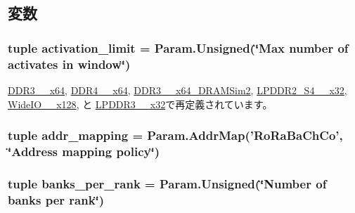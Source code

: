 \subsection{変数}
\hypertarget{classDRAMCtrl_1_1DRAMCtrl_a96b5e1268f3ab4cfa8c9203598fd98c9}{
\subsubsection[{activation\_\-limit}]{\setlength{\rightskip}{0pt plus 5cm}tuple {\bf activation\_\-limit} = Param.Unsigned(\char`\"{}Max number of activates in window\char`\"{})}}
\label{classDRAMCtrl_1_1DRAMCtrl_a96b5e1268f3ab4cfa8c9203598fd98c9}


\hyperlink{classDRAMCtrl_1_1DDR3__1600__x64_a8b6fa0e85fb36be7e08d5c992065d7c2}{DDR3\_\_\-x64}, \hyperlink{classDRAMCtrl_1_1DDR4__2400__x64_a8b6fa0e85fb36be7e08d5c992065d7c2}{DDR4\_\_\-x64}, \hyperlink{classDRAMCtrl_1_1DDR3__1333__x64__DRAMSim2_a8b6fa0e85fb36be7e08d5c992065d7c2}{DDR3\_\_\-x64\_\-DRAMSim2}, \hyperlink{classDRAMCtrl_1_1LPDDR2__S4__1066__x32_a8b6fa0e85fb36be7e08d5c992065d7c2}{LPDDR2\_\-S4\_\_\-x32}, \hyperlink{classDRAMCtrl_1_1WideIO__200__x128_a8b6fa0e85fb36be7e08d5c992065d7c2}{WideIO\_\_\-x128}, と \hyperlink{classDRAMCtrl_1_1LPDDR3__1600__x32_a8b6fa0e85fb36be7e08d5c992065d7c2}{LPDDR3\_\_\-x32}で再定義されています。\hypertarget{classDRAMCtrl_1_1DRAMCtrl_a35512ed731b19b2eacfae921a3c159e0}{
\subsubsection[{addr\_\-mapping}]{\setlength{\rightskip}{0pt plus 5cm}tuple {\bf addr\_\-mapping} = Param.AddrMap('RoRaBaChCo', \char`\"{}Address mapping policy\char`\"{})}}
\label{classDRAMCtrl_1_1DRAMCtrl_a35512ed731b19b2eacfae921a3c159e0}
\hypertarget{classDRAMCtrl_1_1DRAMCtrl_a594ca2e17132484351baf7e79ecb5868}{
\subsubsection[{banks\_\-per\_\-rank}]{\setlength{\rightskip}{0pt plus 5cm}tuple {\bf banks\_\-per\_\-rank} = Param.Unsigned(\char`\"{}Number of {\bf banks} per rank\char`\"{})}}
\label{classDRAMCtrl_1_1DRAMCtrl_a594ca2e17132484351baf7e79ecb5868}


